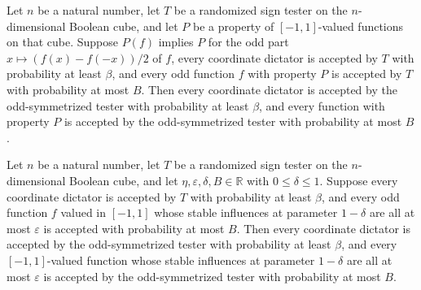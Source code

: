 \begin{theorem}
\label{FABL.SignTester.oddSymmetrization_preserves_parameters_of_property}
\leanok
{}
Let $n$ be a natural number, let $T$ be a randomized sign tester on the $n$-dimensional
Boolean cube, and let $P$ be a property of $[-1,1]$-valued functions on that cube.
Suppose $P(f)$ implies $P$ for the odd part $x\mapsto(f(x)-f(-x))/2$ of $f$, every
coordinate dictator is accepted by $T$ with probability at least $\beta$, and every odd
function $f$ with property $P$ is accepted by $T$ with probability at most $B$. Then
every coordinate dictator is accepted by the odd-symmetrized tester with probability at
least $\beta$, and every function with property $P$ is accepted by the odd-symmetrized
tester with probability at most $B$.
\end{theorem}

\begin{theorem}
\label{FABL.SignTester.oddSymmetrization_preserves_parameters}
\leanok
{}
Let $n$ be a natural number, let $T$ be a randomized sign tester on the $n$-dimensional
Boolean cube, and let $\eta,\varepsilon,\delta, B\in\mathbb{R}$ with
$0\leq\delta\leq1$. Suppose every coordinate dictator is accepted by $T$ with
probability at least $\beta$, and every odd function $f$ valued in $[-1,1]$ whose stable
influences at parameter $1-\delta$ are all at most $\varepsilon$ is accepted with
probability at most $B$. Then every coordinate dictator is accepted by the
odd-symmetrized tester with probability at least $\beta$, and every $[-1,1]$-valued
function whose stable influences at parameter $1-\delta$ are all at most $\varepsilon$
is accepted by the odd-symmetrized tester with probability at most $B$.
\end{theorem}

